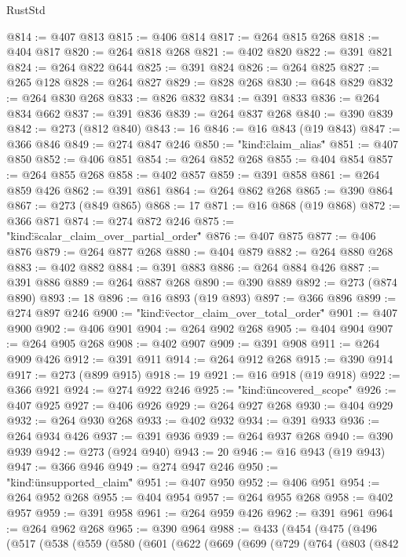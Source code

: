 \begin{lexlean}{RustStd}
\begin{coremodule}
{{{{{{{{{{{{{{@814 := @407 @813
@815 := @406 @814
@817 := @264 @815 @268
@818 := @404 @817
@820 := @264 @818 @268
@821 := @402 @820
@822 := @391 @821
@824 := @264 @822 @644
@825 := @391 @824
@826 := @264 @825
@827 := @265 @128
@828 := @264 @827
@829 := @828 @268
@830 := @648 @829
@832 := @264 @830 @268
@833 := @826 @832
@834 := @391 @833
@836 := @264 @834 @662
@837 := @391 @836
@839 := @264 @837 @268
@840 := @390 @839
@842 := @273 (@812 @840)
@843 := 16
@846 := @16 @843 (@19 @843)
@847 := @366 @846
@849 := @274 @847 @246
@850 := "{\"kind\":\"claim_alias\""
@851 := @407 @850
@852 := @406 @851
@854 := @264 @852 @268
@855 := @404 @854
@857 := @264 @855 @268
@858 := @402 @857
@859 := @391 @858
@861 := @264 @859 @426
@862 := @391 @861
@864 := @264 @862 @268
@865 := @390 @864
@867 := @273 (@849 @865)
@868 := 17
@871 := @16 @868 (@19 @868)
@872 := @366 @871
@874 := @274 @872 @246
@875 := "{\"kind\":\"scalar_claim_over_partial_order\""
@876 := @407 @875
@877 := @406 @876
@879 := @264 @877 @268
@880 := @404 @879
@882 := @264 @880 @268
@883 := @402 @882
@884 := @391 @883
@886 := @264 @884 @426
@887 := @391 @886
@889 := @264 @887 @268
@890 := @390 @889
@892 := @273 (@874 @890)
@893 := 18
@896 := @16 @893 (@19 @893)
@897 := @366 @896
@899 := @274 @897 @246
@900 := "{\"kind\":\"vector_claim_over_total_order\""
@901 := @407 @900
@902 := @406 @901
@904 := @264 @902 @268
@905 := @404 @904
@907 := @264 @905 @268
@908 := @402 @907
@909 := @391 @908
@911 := @264 @909 @426
@912 := @391 @911
@914 := @264 @912 @268
@915 := @390 @914
@917 := @273 (@899 @915)
@918 := 19
@921 := @16 @918 (@19 @918)
@922 := @366 @921
@924 := @274 @922 @246
@925 := "{\"kind\":\"uncovered_scope\""
@926 := @407 @925
@927 := @406 @926
@929 := @264 @927 @268
@930 := @404 @929
@932 := @264 @930 @268
@933 := @402 @932
@934 := @391 @933
@936 := @264 @934 @426
@937 := @391 @936
@939 := @264 @937 @268
@940 := @390 @939
@942 := @273 (@924 @940)
@943 := 20
@946 := @16 @943 (@19 @943)
@947 := @366 @946
@949 := @274 @947 @246
@950 := "{\"kind\":\"unsupported_claim\""
@951 := @407 @950
@952 := @406 @951
@954 := @264 @952 @268
@955 := @404 @954
@957 := @264 @955 @268
@958 := @402 @957
@959 := @391 @958
@961 := @264 @959 @426
@962 := @391 @961
@964 := @264 @962 @268
@965 := @390 @964
@988 := @433
    (@454
      (@475
        (@496
          (@517
            (@538
              (@559
                (@580
                  (@601
                    (@622
                      (@669
                        (@699
                          (@729
                            (@764
                              (@803
                                (@842
}}}}}}}}}}}}}}}}}}}
\end{coremodule}
\end{lexlean}
